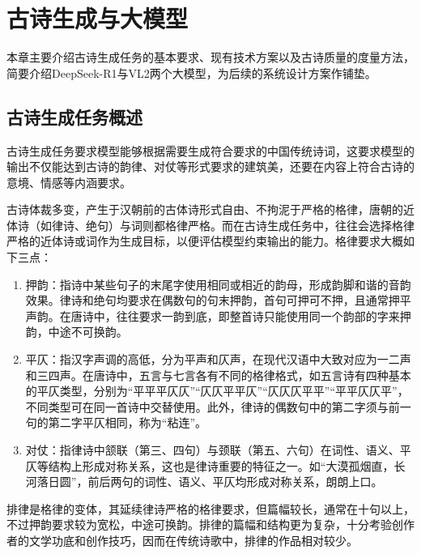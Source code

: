 
\chapter{古诗生成与大模型}

本章主要介绍古诗生成任务的基本要求、现有技术方案以及古诗质量的度量方法，简要介绍DeepSeek-R1与VL2两个大模型，为后续的系统设计方案作铺垫。

\section{古诗生成任务概述}

古诗生成任务要求模型能够根据需要生成符合要求的中国传统诗词，这要求模型的输出不仅能达到古诗的韵律、对仗等形式要求的建筑美，还要在内容上符合古诗的意境、情感等内涵要求。

古诗体裁多变，产生于汉朝前的古体诗形式自由、不拘泥于严格的格律，唐朝的近体诗（如律诗、绝句）与词则都格律严格。而在古诗生成任务中，往往会选择格律严格的近体诗或词作为生成目标，以便评估模型约束输出的能力。格律要求大概如下三点：

\begin{enumerate}
    \item 押韵：指诗中某些句子的末尾字使用相同或相近的韵母，形成韵脚和谐的音韵效果。律诗和绝句均要求在偶数句的句末押韵，首句可押可不押，且通常押平声韵。在唐诗中，往往要求一韵到底，即整首诗只能使用同一个韵部的字来押韵，中途不可换韵。
    \item 平仄：指汉字声调的高低，分为平声和仄声，在现代汉语中大致对应为一二声和三四声。在唐诗中，五言与七言各有不同的格律格式，如五言诗有四种基本的平仄类型，分别为“平平平仄仄”“仄仄平平仄”“仄仄仄平平”“平平仄仄平”，不同类型可在同一首诗中交替使用。此外，律诗的偶数句中的第二字须与前一句的第二字平仄相同，称为“粘连”。
    \item 对仗：指律诗中颔联（第三、四句）与颈联（第五、六句）在词性、语义、平仄等结构上形成对称关系，这也是律诗重要的特征之一。如“大漠孤烟直，长河落日圆”，前后两句的词性、语义、平仄均形成对称关系，朗朗上口。
\end{enumerate}

排律是格律的变体，其延续律诗严格的格律要求，但篇幅较长，通常在十句以上，不过押韵要求较为宽松，中途可换韵。排律的篇幅和结构更为复杂，十分考验创作者的文学功底和创作技巧，因而在传统诗歌中，排律的作品相对较少。




